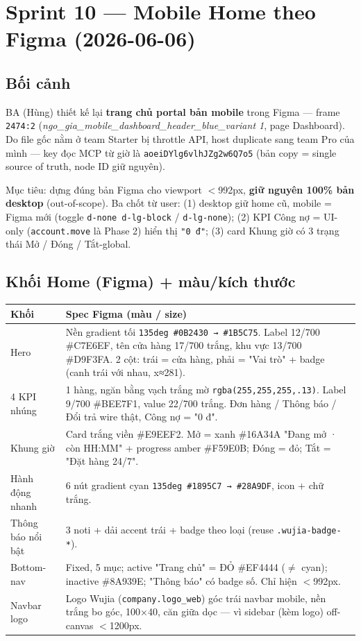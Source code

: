 \chapter{Sprint 10 --- Mobile Home theo Figma (2026-06-06)}

\section{Bối cảnh}

BA (Hùng) thiết kế lại \textbf{trang chủ portal bản mobile} trong Figma --- frame
\texttt{2474:2} (\emph{ngo\_gia\_mobile\_dashboard\_header\_blue\_variant 1}, page
Dashboard). Do file gốc nằm ở team Starter bị throttle API, host duplicate sang
team Pro của mình --- key đọc MCP từ giờ là \texttt{aoeiDYlg6vlhJZg2w6Q7o5}
(bản copy = single source of truth, node ID giữ nguyên).

Mục tiêu: dựng đúng bản Figma cho viewport \(<\)992px, \textbf{giữ nguyên 100\%
bản desktop} (out-of-scope). Ba chốt từ user: (1) desktop giữ home cũ, mobile =
Figma mới (toggle \texttt{d-none d-lg-block} / \texttt{d-lg-none}); (2) KPI Công nợ
= UI-only (\texttt{account.move} là Phase 2) hiển thị \texttt{"0 đ"}; (3) card Khung
giờ có 3 trạng thái Mở / Đóng / Tắt-global.

\section{Khối Home (Figma) + màu/kích thước}

\begin{longtable}{@{}lp{8.6cm}@{}}
\toprule
\textbf{Khối} & \textbf{Spec Figma (màu / size)} \\
\midrule
\endhead
Hero & Nền gradient tối \texttt{135deg \#0B2430 → \#1B5C75}. Label 12/700
\#C7E6EF, tên cửa hàng 17/700 trắng, khu vực 13/700 \#D9F3FA. 2 cột: trái =
cửa hàng, phải = "Vai trò" + badge (canh trái với nhau, x≈281). \\
4 KPI nhúng & 1 hàng, ngăn bằng vạch trắng mờ \texttt{rgba(255,255,255,.13)}.
Label 9/700 \#BEE7F1, value 22/700 trắng. Đơn hàng / Thông báo / Đổi trả wire
thật, Công nợ = "0 đ". \\
Khung giờ & Card trắng viền \#E9EEF2. Mở = xanh \#16A34A "Đang mở · còn HH:MM" +
progress amber \#F59E0B; Đóng = đỏ; Tắt = "Đặt hàng 24/7". \\
Hành động nhanh & 6 nút gradient cyan \texttt{135deg \#1895C7 → \#28A9DF}, icon +
chữ trắng. \\
Thông báo nổi bật & 3 noti + dải accent trái + badge theo loại (reuse
\texttt{.wujia-badge-*}). \\
Bottom-nav & Fixed, 5 mục; active "Trang chủ" = ĐỎ \#EF4444 (\(\neq\) cyan);
inactive \#8A939E; "Thông báo" có badge số. Chỉ hiện \(<\)992px. \\
Navbar logo & Logo Wujia (\texttt{company.logo\_web}) góc trái navbar mobile, nền
trắng bo góc, 100×40, căn giữa dọc --- vì sidebar (kèm logo) off-canvas \(<\)1200px. \\
\bottomrule
\end{longtable}

